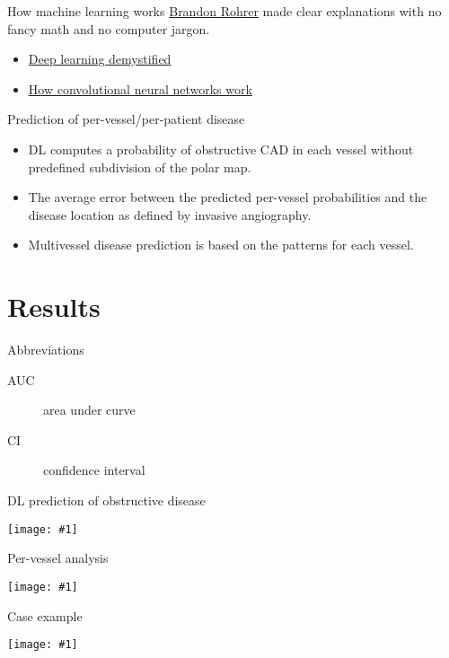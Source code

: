 \documentclass{beamer}
\newcommand*{\solo}[1]{\texttt{[image: \#1]}}
\begin{document}
\begin{frame}{How machine learning works}
    \href{https://brohrer.github.io/}{Brandon Rohrer} made clear explanations
    with no fancy math and no computer jargon.
    \begin{itemize}
        \item \href{https://brohrer.github.io/deep_learning_demystified.html}{Deep learning demystified}
        \item \href{https://brohrer.github.io/how_convolutional_neural_networks_work.html}{How convolutional neural networks work}
    \end{itemize}
\end{frame}

\begin{frame}{Prediction of per-vessel/per-patient disease}
    \begin{itemize}
        \item
            DL computes a probability of obstructive CAD in each vessel without
            predefined subdivision of the polar map.
        \item
            The average error between the predicted per-vessel probabilities
            and the disease location as defined by invasive angiography.
        \item
            Multivessel disease prediction is based on the patterns for each
            vessel.
    \end{itemize}
\end{frame}

\section{Results}
\begin{frame}{Abbreviations}
    \begin{description}
        \item[AUC] area under curve
        \item[CI] confidence interval
    \end{description}
\end{frame}

\begin{frame}{DL prediction of obstructive disease}
    \begin{center}
        \solo{2.eps}
    \end{center}
\end{frame}

\begin{frame}{Per-vessel analysis}
    \begin{center}
        \solo{3.eps}
    \end{center}
\end{frame}

\begin{frame}{Case example}
    \begin{center}
        \solo{4.eps}
    \end{center}
\end{frame}
\end{document}
